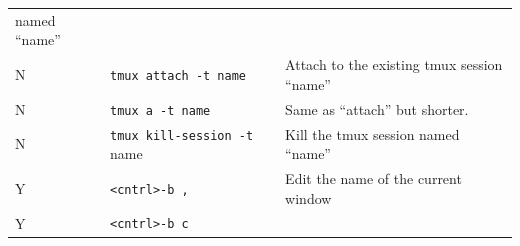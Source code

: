 \documentclass[]{krantz}
\begin{document}
\begin{longtable}[]{@{}lll@{}}
\begin{minipage}[t]{0.38\columnwidth}
named ``name''\strut
\end{minipage}\tabularnewline
\begin{minipage}[t]{0.18\columnwidth}\raggedright
N\strut
\end{minipage} & \begin{minipage}[t]{0.36\columnwidth}\raggedright
\texttt{tmux\ attach\ -t\ name}\strut
\end{minipage} & \begin{minipage}[t]{0.38\columnwidth}\raggedright
Attach to the existing tmux
session ``name''\strut
\end{minipage}\tabularnewline
\begin{minipage}[t]{0.18\columnwidth}\raggedright
N\strut
\end{minipage} & \begin{minipage}[t]{0.36\columnwidth}\raggedright
\texttt{tmux\ a\ -t\ name}\strut
\end{minipage} & \begin{minipage}[t]{0.38\columnwidth}\raggedright
Same as ``attach'' but shorter.\strut
\end{minipage}\tabularnewline
\begin{minipage}[t]{0.18\columnwidth}\raggedright
N\strut
\end{minipage} & \begin{minipage}[t]{0.36\columnwidth}\raggedright
\texttt{tmux\ kill-session\ -t} name\strut
\end{minipage} & \begin{minipage}[t]{0.38\columnwidth}\raggedright
Kill the tmux session named
``name''\strut
\end{minipage}\tabularnewline
\begin{minipage}[t]{0.18\columnwidth}\raggedright
Y\strut
\end{minipage} & \begin{minipage}[t]{0.36\columnwidth}\raggedright
\texttt{\textless{}cntrl\textgreater{}-b\ ,}\strut
\end{minipage} & \begin{minipage}[t]{0.38\columnwidth}\raggedright
Edit the name of the current
window\strut
\end{minipage}\tabularnewline
\begin{minipage}[t]{0.18\columnwidth}\raggedright
Y\strut
\end{minipage} & \begin{minipage}[t]{0.36\columnwidth}\raggedright
\texttt{\textless{}cntrl\textgreater{}-b\ c}\strut
\end{minipage} & \begin{minipage}[t]{0.38\columnwidth}\raggedright

\end{minipage}
\end{longtable}
\end{document}
